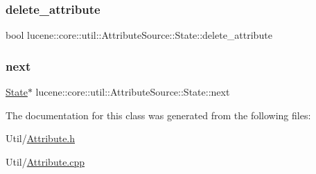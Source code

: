 \subsubsection{\texorpdfstring{delete\+\_\+attribute}{delete\_attribute}}
{\footnotesize\ttfamily bool lucene\+::core\+::util\+::\+Attribute\+Source\+::\+State\+::delete\+\_\+attribute}

\mbox{\label{classlucene_1_1core_1_1util_1_1AttributeSource_1_1State_af3f4b6f537c2da0ad12260b6ac698da2}} 
\subsubsection{\texorpdfstring{next}{next}}
{\footnotesize\ttfamily \mbox{\hyperlink{classlucene_1_1core_1_1util_1_1AttributeSource_1_1State}{State}}$\ast$ lucene\+::core\+::util\+::\+Attribute\+Source\+::\+State\+::next}



The documentation for this class was generated from the following files\+:\begin{DoxyCompactItemize}
\item 
Util/\mbox{\hyperlink{Util_2Attribute_8h}{Attribute.\+h}}\item 
Util/\mbox{\hyperlink{Util_2Attribute_8cpp}{Attribute.\+cpp}}\end{DoxyCompactItemize}
